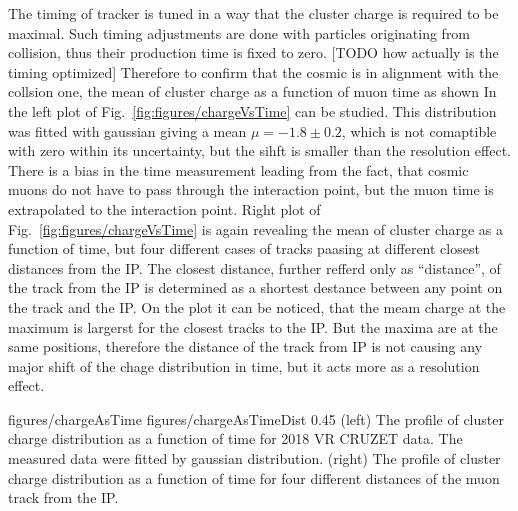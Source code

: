 The timing of tracker is tuned in a way that the cluster charge is required to be maximal. Such timing adjustments are done with particles originating from collision, thus their production time is fixed to zero. [TODO how actually is the timing optimized] Therefore to confirm that the cosmic is in alignment with the collsion one, the mean of cluster charge as a function of muon time as shown In the left plot of Fig.~\ref{fig:figures/chargeVsTime} can be studied. This distribution was fitted with gaussian giving a mean $\mu = -1.8 \pm 0.2$, which is not comaptible with zero within its uncertainty, but the sihft is smaller than the resolution effect. There is a bias in the time measurement leading from the fact, that cosmic muons do not have to pass through the interaction point, but the muon time is extrapolated to the interaction point. Right plot of Fig.~\ref{fig:figures/chargeVsTime} is again revealing the mean of cluster charge as a function of time, but four different cases of tracks paasing at different closest distances from the IP. The closest distance, further refferd only as ``distance'', of the track from the IP  is determined as a shortest destance between any point on the track and the IP. On the plot it can be noticed, that the meam charge at the maximum is largerst for the closest tracks to the IP. But the maxima are at the same positions, therefore the distance of the  track from IP is not causing any major shift of the chage distribution in time, but it acts more as a resolution effect. 


                 {figures/chargeAsTime}
                 {figures/chargeAsTimeDist} %
                 {0.45}       %
                 {(left) The profile of cluster charge distribution as a function of time for 2018 VR CRUZET data. The measured data were fitted by gaussian distribution. (right) The profile of cluster charge distribution as a function of time for four different distances of the muon track from the IP. }

